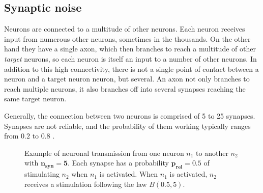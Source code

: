 \documentclass[journal]{IEEEtran}
\begin{document}
\subsection{Synaptic noise}

Neurons are connected to a multitude of other neurons. Each neuron receives input from numerous other neurons, sometimes in the thousands. On the other hand they have a single axon, which then branches to reach a multitude of other \emph{target} neurons, so each neuron is itself an input to a number of other neurons. In addition to this high connectivity, there is not a single point of contact between a neuron and a target neuron neuron, but several. An axon not only branches to reach multiple neurons, it also branches off into several synapses reaching the same target neuron. 

Generally, the connection between two neurons is comprised of 5 to 25 synapses\cite{branco2009probability}. Synapses are not reliable\cite{branco2009probability,allen1994evaluation}, and the probability of them working typically ranges from $0.2$ to $0.8$ \cite{branco2009probability}. 

\begin{figure}

\caption{Example of neuronal transmission from one neuron $n_1$ to another $n_2$ with $\mathbf{n_{syn} = 5}$. Each synapse has a probability $\mathbf{p_{rel} = 0.5}$ of stimulating $n_2$ when $n_1$ is activated. When $n_1$ is activated, $n_2$ receives a stimulation following the law $B(0.5, 5)$.}
\label{fig:synmodel}
\end{figure}
\end{document}
